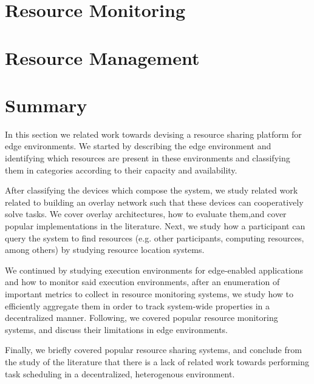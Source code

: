 \section{Resource Monitoring} \label{sec:res_monitoring} 

\section{Resource Management} \label{sec:res_management} 

\section{Summary}

In this section we related work towards devising a resource sharing platform for edge environments. We started by describing the edge environment and identifying which resources are present in these environments and classifying them in categories according to their capacity and availability. 

After classifying the devices which compose the system, we study related work related to building an overlay network such that these devices can cooperatively solve tasks. We cover overlay architectures, how to evaluate them,and cover popular implementations in the literature. Next, we study how a participant can query the system to find resources (e.g. other participants, computing resources, among others) by studying resource location systems.

We continued by studying execution environments for edge-enabled applications and how to monitor said execution environments, after an enumeration of important metrics to collect in resource monitoring systems, we study how to efficiently aggregate them in order to track system-wide properties in a decentralized manner. Following, we covered popular resource monitoring systems, and discuss their limitations in edge environments. 

Finally, we briefly covered popular resource sharing systems, and conclude from the study of the literature that there is a lack of related work towards performing task scheduling in a decentralized, heterogenous environment. 